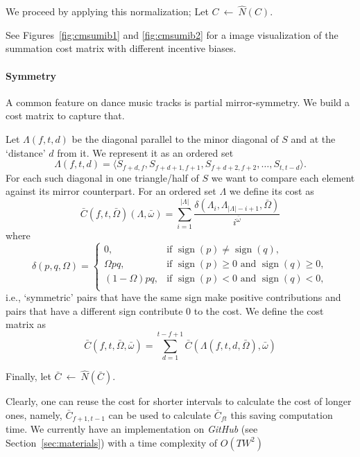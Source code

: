 \documentclass[twocolumn]{article}
\newcommand{\sign}{\mathop{\mathrm{sign}}}
\begin{document}
	
	We proceed by applying this normalization; Let $C~\leftarrow~\hat N(C)$.
	
	See Figures~\ref{fig:cmsumib1} and \ref{fig:cmsumib2} for a image visualization of the summation cost matrix with different incentive biases.
	
	\paragraph{Symmetry}	
	
A common feature on dance music tracks is partial mirror-symmetry. We build a cost matrix to capture that.
	
Let $\Lambda(f,t,d)$ be the diagonal parallel to the minor diagonal
of $S$ and at the `distance' $d$ from it. We represent it as an ordered set
\begin{dmath*}
\Lambda(f,t,d)
 = \langle S_{f+d,f}, S_{f+d+1, f+1}, S_{f+d+2, f+2},\ldots, S_{t, t-d}\rangle.
	\end{dmath*} 
For each such diagonal in one triangle/half of $S$ we want to compare
each element against its mirror counterpart. For an ordered set
$\Lambda$ we define its cost as
\begin{dmath*}
\bar C(f,t,\bar \Omega)(\Lambda, \bar \omega)=\sum_{i=1}^{|\Lambda|} \frac{ \delta(\Lambda_i,\Lambda_{|\Lambda|-i+1},\bar \Omega)}{i^{\bar \omega}}
\end{dmath*}
where
\begin{dmath*}
\delta(p,q,\Omega) = 
\left\{\begin{array}{ll}
0,  & \text{if~}\sign( p ) \ne \sign( q ),\\
\Omega pq,   & \text{if~}  \sign(p) \ge 0 \text{~and~} \sign(q) \ge 0 ,  \\
(1-\Omega)pq,  & \text{if~} \sign(p) < 0 \text{~and~} \sign(q) < 0, \\
\end{array}\right.
\end{dmath*}
i.e., `symmetric' pairs that have the same sign make positive
contributions and pairs that have a different sign contribute $0$ to
the cost. We define the cost matrix as
\begin{dmath*}
\bar C(f,t,\bar \Omega, \bar \omega) = \sum_{d=1}^{t-f+1}\bar C(\Lambda(f,t,d,\bar \Omega), \bar \omega)
\end{dmath*}

Finally, let $\bar C~\leftarrow~\hat N(\bar C)$.

Clearly, one can reuse the cost for shorter intervals to calculate the
cost of longer ones, namely, $\bar C_{f+1,t-1}$ can be used to
calculate $\bar C_{ft}$ this saving computation time. We currently have an implementation on \textit{GitHub} (see Section~\ref{sec:materials}) with a time complexity of $O(TW^2)$
\end{document}
